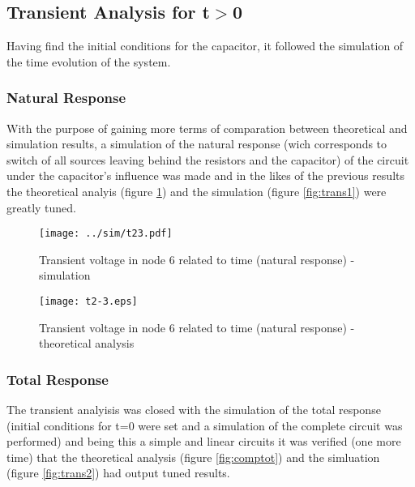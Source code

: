 

\subsection{Transient Analysis for t$>$0}

Having find the initial conditions for the capacitor, it followed the simulation of the time evolution of the system.

\subsubsection{Natural Response}

With the purpose of gaining more terms of comparation between theoretical and simulation results, a simulation of the natural response (wich corresponds to switch of all sources leaving behind the resistors and the capacitor) of the circuit under the capacitor's influence was made and in the likes of the previous results the theoretical analyis (figure \ref{fig:compnat}) and the simulation (figure \ref{fig:trans1}) were greatly tuned.


\begin{figure}[h] \centering
  \begin{minipage}{.5\textwidth}
    \texttt{[image: ../sim/t23.pdf]}
    \caption{Transient voltage in node 6 related to time (natural response) - simulation}
    \label{fig:trans1}
    \end{minipage}%
  \begin{minipage}{.5\textwidth}
    \vspace{10mm}
  \centering
    \texttt{[image: t2-3.eps]}
    \caption{Transient voltage in node 6 related to time (natural response) - theoretical analysis}
    \label{fig:compnat}
      \end{minipage}%
\end{figure}

\subsubsection{Total Response}

The transient analyisis was closed with the simulation of the total response (initial conditions for t=0 were set and a simulation of the complete circuit was performed) and being this a simple and linear circuits it was verified (one more time) that the theoretical analysis (figure \ref{fig:comptot}) and the simluation (figure \ref{fig:trans2}) had output tuned results.


